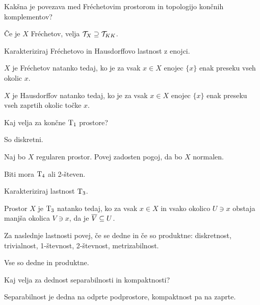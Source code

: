 \begin{vo}{Kakšna je povezava med Fréchetovim prostorom in topologijo končnih
komplementov?}

Če je $X$ Fréchetov, velja $\mathcal{T}_X \supseteq \mathcal{T}_{KK}$.

\end{vo}

\begin{vo}{Karakteriziraj Fréchetovo in Hausdorffovo lastnost z enojci.}

$X$ je Fréchetov natanko tedaj, ko je za vsak $x \in X$ enojec $\{x\}$
enak preseku vseh okolic $x$.

$X$ je Hausdorffov natanko tedaj, ko je za vsak $x \in X$ enojec $\{x\}$
enak preseku vseh zaprtih okolic točke $x$.

\end{vo}

\begin{vo}{Kaj velja za končne $\text{T}_{1}$ prostore?}

So diskretni.

\end{vo}

\begin{vo}{Naj bo $X$ regularen prostor. Povej zadosten pogoj, da bo $X$
normalen.}

Biti mora $\text{T}_{4}$ ali 2-števen.

\end{vo}

\begin{vo}{Karakteriziraj lastnost $\text{T}_{3}$.}

Prostor $X$ je $\text{T}_{3}$ natanko tedaj, ko za vsak $x \in X$ in vsako
okolico $U \ni x$ obstaja manjša okolica $V \ni x$, da je $\overline{V} \subseteq U$.

\end{vo}

\begin{vo}{Za naslednje lastnosti povej, če se dedne in če so produktne:
diskretnost, trivialnost, 1-števnost, 2-števnost, metrizabilnost.}

Vse so dedne in produktne.

\end{vo}

\begin{vo}{Kaj velja za dednost separabilnosti in kompaktnosti?}

Separabilnost je dedna na odprte podprostore, kompaktnost pa na zaprte.

\end{vo}

